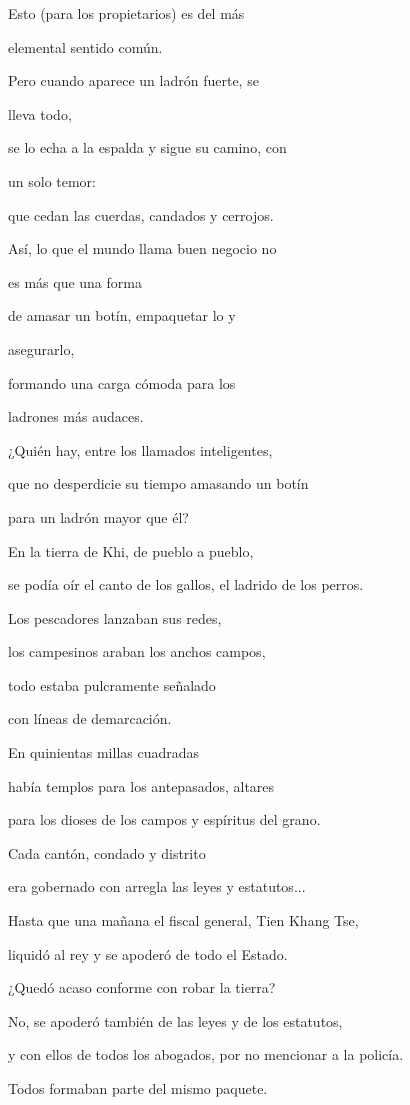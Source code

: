 Esto (para los propietarios) es del más

elemental sentido común.

Pero cuando aparece un ladrón fuerte, se

lleva todo,

se lo echa a la espalda y sigue su camino, con

un solo temor:

que cedan las cuerdas, candados y cerrojos.

Así, lo que el mundo llama buen negocio no

es más que una forma

de amasar un botín, empaquetar lo y

asegurarlo,

formando una carga cómoda para los

ladrones más audaces.

¿Quién hay, entre los llamados inteligentes,

que no desperdicie su tiempo amasando un botín

para un ladrón mayor que él?

En la tierra de Khi, de pueblo a pueblo,

se podía oír el canto de los gallos, el ladrido de los perros.

Los pescadores lanzaban sus redes,

los campesinos araban los anchos campos,

todo estaba pulcramente señalado

con líneas de demarcación.

En quinientas millas cuadradas

había templos para los antepasados, altares

para los dioses de los campos y espíritus del grano.

Cada cantón, condado y distrito

era gobernado con arregla las leyes y estatutos...

Hasta que una mañana el fiscal general, Tien Khang Tse,

liquidó al rey y se apoderó de todo el Estado.

¿Quedó acaso conforme con robar la tierra?

No, se apoderó también de las leyes y de los estatutos,

y con ellos de todos los abogados, por no mencionar a la policía.

Todos formaban parte del mismo paquete.

